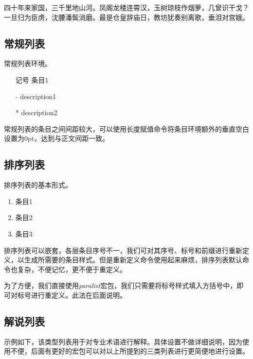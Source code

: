 四十年来家国，三千里地山河。凤阁龙楼连霄汉，玉树琼枝作烟萝，几曾识干戈？一旦归为臣虏，沈腰潘鬓消磨。最是仓皇辞庙日，教坊犹奏别离歌，垂泪对宫娥。

\subsection{常规列表}
常规列表环境。

\begin{codeshow}
\begin{itemize}
    \item[记号] 条目1
    \item[-] description1
    \item[*] description2
\end{itemize}
\end{codeshow}

常规列表的条目之间间距较大，可以使用长度赋值命令将条目环境额外的垂直空白设置为0pt，达到与正文间距一致。

\begin{latex}
\itemsep=0pt
\parskip=0pt
\end{latex}

\subsection{排序列表}
排序列表的基本形式。

\begin{codeshow}
    \begin{enumerate}
        \item 条目1
        \item 条目2
        \item 条目3
    \end{enumerate}
\end{codeshow}

排序列表可以嵌套，各层条目序号不一，我们可对其序号、标号和前缀进行重新定义，以生成所需要的条目样式。但是重新定义命令使用起来麻烦，排序列表默认命令也复杂，不便记忆，更不便于重定义。

为了方便，我们直接使用\emph{paralist}宏包，我们只需要将标号样式填入方括号中，即可对标号进行重定义。此法在后面说明。

\subsection{解说列表}
示例如下，该类型列表用于对专业术语进行解释。具体设置不做详细说明，因为使用不便，后面有更好的宏包可以对以上所提到的三类列表进行更简便地进行设置。

